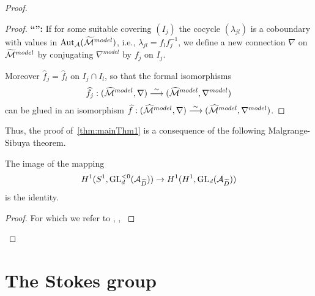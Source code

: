 \begin{proof}
\begin{proof}
    \textbf{``\Leftarrow{}'':}
    If for some suitable covering $(I_j)$ the cocycle $(\lambda_{jl})$ is a
    coboundary with values in $\operatorname{Aut}_\mathcal{A}(\widetilde{\mathcal{M}}^{model})$, i.e.,
    $\lambda_{jl}=f_lf_j^{-1}$, we define a new connection $\nabla$ on
    $\widetilde{\mathcal{M}}^{model}$ by conjugating $\nabla^{model}$ by $f_j$ on $I_j$.

    \TODO{}

    Moreover $\hat f_j=\hat f_l$ on $I_j\cap I_l$, so that the formal
    isomorphisms
    \[
      \widehat f_j:(\widehat {\mathcal{M}}^{model},\nabla)
      \overset{\sim}{\longrightarrow}
      (\widehat{\mathcal{M}}^{model},\nabla^{model})
    \]
    can be glued in an isomorphism $\widehat f:(\widehat {\mathcal{M}}^{model},\nabla)
    \overset{\sim}{\longrightarrow}(\widehat{\mathcal{M}}^{model},\nabla^{model})$.
  \end{proof}

  Thus, the proof of~\ref{thm:mainThm1} is a consequence of the following
  Malgrange-Sibuya theorem.
  \begin{thm}
    The image of the mapping
    \[
      H^1(S^1,\operatorname{GL}_d^{<0}(\mathcal{A}_{\widetilde D}))
      \to
      H^1(H^1,\operatorname{GL}_d(\mathcal{A}_{\widetilde D}))
    \]
    is the identity.
  \end{thm}
  \begin{proof}
     For which we refer to
     \cite[Th.A.1]{Malgrange1983},
     \cite[Th.6.4.1]{sibuya1990Linear},
     \cite{babbitt1989local}
  \end{proof}
\end{proof}

\section{The Stokes group}
\begin{comment}
  See \cite{Loday1994}
\end{comment}

